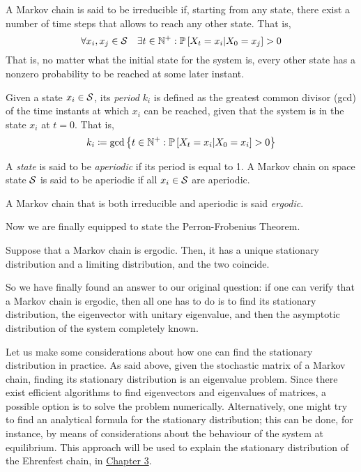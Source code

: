 \begin{ndef} 
    A Markov chain is said to be irreducible if, starting from any state, there exist a number of time steps that allows to reach any other state. That is, 
    \begin{equation}
        \forall x_i, x_j \in \mathcal{S} \quad \exists t\in \mathbb{N}^+ : \mathbb{P}\left[X_t = x_i|X_0 = x_j\right] > 0
    \end{equation}
    That is, no matter what the initial state for the system is, every other state has a nonzero probability to be reached at some later instant.
\end{ndef}
\begin{ndef} 
    Given a state $x_i \in \mathcal{S}$, its \emph{period} $k_i$ is defined as the greatest common divisor (gcd) of the time instants at which $x_i$ can be reached, given that the system is in the state $x_i$ at $t=0$. That is,
    \begin{equation}
        k_i \coloneqq \text{gcd} \left\{ t\in \mathbb{N}^+ : \mathbb{P}\left[X_t = x_i | X_0 = x_i\right] > 0 \right\}
    \end{equation}
    
\end{ndef}
\begin{ndef} [Aperiodicity]
    A \emph{state} is said to be \emph{aperiodic} if its period is equal to 1. A Markov chain on space state $\mathcal{S}$ is said to be aperiodic if all $x_i \in \mathcal{S}$ are aperiodic. 
\end{ndef}
\begin{ndef} [Ergodicity]
    A Markov chain that is both irreducible and aperiodic is said \emph{ergodic}.
\end{ndef}
Now we are finally equipped to state the Perron-Frobenius Theorem.

\begin{theorem} \label{th:perron-frobenius}
    Suppose that a Markov chain is ergodic. Then, it has a unique stationary distribution and a limiting distribution, and the two coincide.
\end{theorem}

\medskip
So we have finally found an answer to our original question: if one can verify that a Markov chain is ergodic, then all one has to do is to find its stationary distribution, \ie the eigenvector with unitary eigenvalue, and then the asymptotic distribution of the system completely known. 

Let us make some considerations about how one can find the stationary distribution in practice. As said above, given the stochastic matrix of a Markov chain, finding its stationary distribution is an eigenvalue problem. Since there exist efficient algorithms to find eigenvectors and eigenvalues of matrices, a possible option is to solve the problem numerically. Alternatively, one might try to find an analytical formula for the stationary distribution; this can be done, for instance, by means of considerations about the behaviour of the system at equilibrium. This approach will be used to explain the stationary distribution of the Ehrenfest chain, in \hyperref[ch:3]{Chapter 3}.


